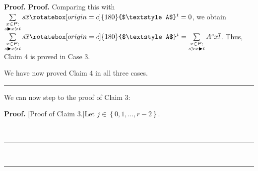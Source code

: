 \documentclass[numbers=enddot,12pt,final,onecolumn,notitlepage]{scrartcl}%
\theoremstyle{definition}
\newcommand{\upslack}{\mathchoice{\rotatebox[origin=c]{180}{$\displaystyle A$}}{\rotatebox[origin=c]{180}{$\textstyle A$}}{\rotatebox[origin=c]{180}{$\scriptstyle A$}}{\rotatebox[origin=c]{180}{$\scriptscriptstyle A$}}}
\newcommand{\downslack}{A}
\newenvironment{proof}[1][Proof]{\noindent\textbf{#1.} }{\ \rule{0.5em}{0.5em}}
\let\sumnonlimits\sum
\renewcommand{\sum}{\sumnonlimits\limits}
\begin{document}
\begin{proof}
\begin{proof}
Comparing this with $\sum_{\substack{x\in P;\\s\blacktriangleright x\gtrdot
t}}s\overline{x}\upslack^{t}=0$, we obtain $\sum_{\substack{x\in
P;\\s\blacktriangleright x\gtrdot t}}s\overline{x}\upslack^{t}=\sum
_{\substack{x\in P;\\s\gtrdot x\blacktriangleright t}}\downslack^{s}%
x\overline{t}$. Thus, Claim 4 is proved in Case 3.

We have now proved Claim 4 in all three cases.
\end{proof}

We can now step to the proof of Claim 3:

\begin{proof}
[Proof of Claim 3.]Let $j\in\left\{  0,1,\ldots,r-2\right\}  $.


\end{proof}
\end{proof}
\end{document}
